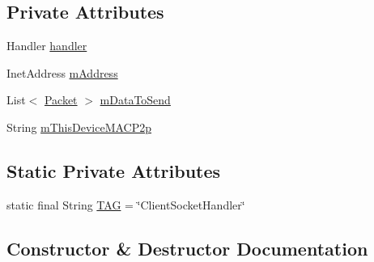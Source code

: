 \subsection*{Private Attributes}
\begin{DoxyCompactItemize}
\item 
Handler \hyperlink{classcom_1_1copelabs_1_1oiframework_1_1wifi_1_1_client_socket_handler_a4184a468a1bc27dc42bf1a671e78d87e}{handler}
\item 
Inet\+Address \hyperlink{classcom_1_1copelabs_1_1oiframework_1_1wifi_1_1_client_socket_handler_a3284788d2f03622ff3985b1a2f04e0a0}{m\+Address}
\item 
List$<$ \hyperlink{classcom_1_1copelabs_1_1oiframework_1_1contentmanager_1_1_packet}{Packet} $>$ \hyperlink{classcom_1_1copelabs_1_1oiframework_1_1wifi_1_1_client_socket_handler_a7e2770e69e37596bc9d2ca983fe39311}{m\+Data\+To\+Send}
\item 
String \hyperlink{classcom_1_1copelabs_1_1oiframework_1_1wifi_1_1_client_socket_handler_a65203e6b9fafa174ef63042dbbec81b4}{m\+This\+Device\+M\+A\+C\+P2p}
\end{DoxyCompactItemize}
\subsection*{Static Private Attributes}
\begin{DoxyCompactItemize}
\item 
static final String \hyperlink{classcom_1_1copelabs_1_1oiframework_1_1wifi_1_1_client_socket_handler_abca4184271635acce97826e479458213}{T\+A\+G} = \char`\"{}Client\+Socket\+Handler\char`\"{}
\end{DoxyCompactItemize}


\subsection{Constructor \& Destructor Documentation}
\hypertarget{classcom_1_1copelabs_1_1oiframework_1_1wifi_1_1_client_socket_handler_a943cf10c4b3b72a7de052a573b98fd1b}{}
